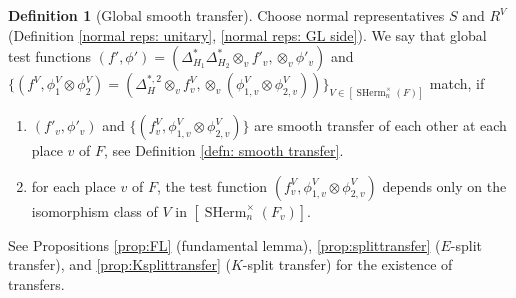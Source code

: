 \documentclass[11pt, reqno]{amsart}
\numberwithin{equation}{subsection}
\theoremstyle{plain}
\theoremstyle{definition}
\newtheorem{definition}[proposition]{Definition}
\DeclareMathOperator{\SHerm}{SHerm}
\begin{document}
\begin{definition}[Global smooth transfer]
\label{defn: global smooth transfer}
Choose normal representatives $S$ and $R^V$ (Definition \ref{normal reps: unitary}, \ref{normal reps: GL side}). We say that global test functions $(f', \phi') = ( \Delta_{H_1}^{*} \Delta_{H_2}^* \otimes_v f'_v , \otimes_v \phi'_v)$ and
$\{(f^V, \phi_1^V \otimes \phi_2^V) = (\Delta_H^{*,2} \otimes_v f^V_v, \otimes_v (\phi_{1,v}^V \otimes \phi_{2,v}^V) ) \}
_{V \in [\SHerm_n^\times(F)]}$ match, if
\begin{enumerate}
    \item $(f'_v,\phi'_v)$ and $\{ (f^V_v,\phi^V_{1,v} \otimes \phi_{2,v}^V) \}$ are smooth transfer of each
other at each place $v$ of $F$, see Definition \ref{defn: smooth transfer}.
    \item for each place $v$ of $F$, the test function $(f_v^V, \phi_{1,v}^V
\otimes \phi_{2,v}^V)$ depends only on the isomorphism class of $V$ in $[\SHerm_n^\times(F_v)]$.
\end{enumerate}
\end{definition}

See Propositions \ref{prop:FL} (fundamental lemma), \ref{prop:splittransfer} ($E$-split transfer), and
\ref{prop:Ksplittransfer} ($K$-split transfer) for the existence of transfers.
\end{document}

